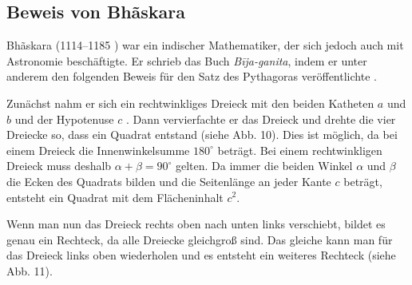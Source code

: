 \documentclass[a4paper,12pt]{article}
\begin{document}
\subsection{Beweis von Bhãskara }

Bhãskara  (1114--1185 \cite{BhaskaraGeschichte1}) war ein indischer Mathematiker, der sich jedoch auch mit Astronomie beschäftigte. Er schrieb das Buch \textit{Bīja-ganita}, indem er unter anderem den folgenden Beweis für den Satz des Pythagoras veröffentlichte \cite{BhaskaraGeschichte2}.

\begin{figwindow}

Zunächst nahm er sich ein rechtwinkliges Dreieck mit den beiden Katheten $a$ und $b$ und der Hypotenuse $c$ \cite{BhaskaraBeweis1} \cite{BhaskaraBeweis2}. Dann vervierfachte er das Dreieck und drehte die vier Dreiecke so, dass ein Quadrat entstand (siehe Abb. 10). Dies ist möglich, da bei einem Dreieck die Innenwinkelsumme $180^\circ$ beträgt. Bei einem rechtwinkligen Dreieck muss deshalb $\alpha + \beta = 90^\circ$ gelten. Da immer die beiden Winkel $\alpha$ und $\beta$ die Ecken des Quadrats bilden und die Seitenlänge an jeder Kante $c$ beträgt,\\ entsteht ein Quadrat mit dem Flächeninhalt $c^2$.

\end{figwindow}

\begin{figwindow}

Wenn man nun das Dreieck rechts oben nach unten links verschiebt, bildet es genau ein Rechteck, da alle Dreiecke gleichgroß sind. Das gleiche kann man für das Dreieck links oben wiederholen und es entsteht ein weiteres Rechteck (siehe Abb. 11).

\end{figwindow}
\end{document}
